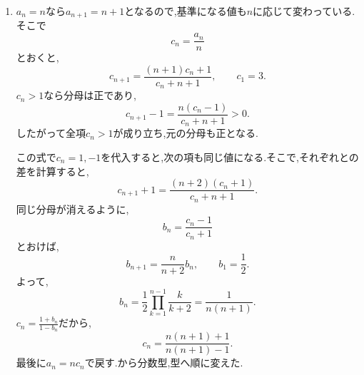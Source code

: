 \begin{enumerate}[label=\textbf{問\arabic*.},leftmargin=3.8em,format=\bookitemlink{practice-advanced}{solution}{problem}]
                付加項は$n$に依存するが,二重のなら二回の和で解ける.
                より先に左辺の構造を見た.

                \noindent \textbf{【別解】}\\
                $\displaystyle r_n=\frac{a_{n+1}}{a_n}$とおき,元の式を$a_na_{n+1}$で割ると,
                \[
                  r_{n+1}=2^{2n+1}r_n,\qquad r_1=8.
                \]
                これは型なので,
                \begin{align*}
                 r_n
                  &=2^{\,3+\sum_{k=1}^{n-1}(2k+1)}\\
                  &=2^{\,n^2+2}.
                \end{align*}
                もう一度比を掛け合わせて,
                \[
                 a_n
                  =2\prod_{k=1}^{n-1}2^{k^2+2}
                  =2^{\,1+\sum_{k=1}^{n-1}(k^2+2)}
                \]
                を得る.で差を取る方法と,元ので比を取る方法は,同じ構造を異なる形で使っている.
          \item $a_n=n$なら$a_{n+1}=n+1$となるので,基準になる値も$n$に応じて変わっている.そこで
                \[
                  c_n=\frac{a_n}{n}
                \]
                とおくと,
                \[
                  c_{n+1}
                   =\frac{(n+1)c_n+1}{c_n+n+1},
                  \qquad c_1=3.
                \]
                $c_n>1$なら分母は正であり,
                \[
                  c_{n+1}-1=\frac{n(c_n-1)}{c_n+n+1}>0.
                \]
                したがって全項$c_n>1$が成り立ち,元の分母も正となる.

                この式で$c_n=1,-1$を代入すると,次の項も同じ値になる.そこで,それぞれとの差を計算すると,
                \[
                  c_{n+1}+1
                   =\frac{(n+2)(c_n+1)}{c_n+n+1}.
                \]
                同じ分母が消えるように,
                \[
                  b_n=\frac{c_n-1}{c_n+1}
                \]
                とおけば,
                \[
                  b_{n+1}=\frac{n}{n+2}b_n,\qquad b_1=\frac12.
                \]
                よって,
                \[
                  b_n
                   =\frac12\prod_{k=1}^{n-1}\frac{k}{k+2}
                   =\frac{1}{n(n+1)}.
                \]
                $\displaystyle c_n=\frac{1+b_n}{1-b_n}$だから,
                \[
                  c_n=\frac{n(n+1)+1}{n(n+1)-1}.
                \]
                最後に$a_n=nc_n$で戻す.から分数型,型へ順に変えた.


\end{enumerate}
